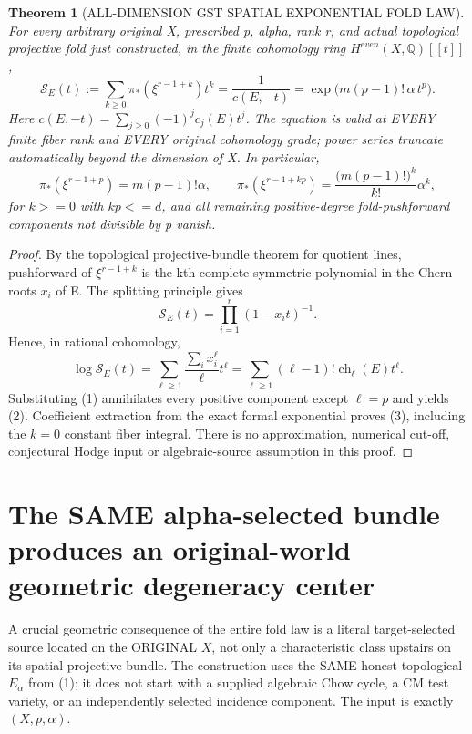 \documentclass[11pt]{article}
\newtheorem{theorem}{Theorem}
\begin{document}
\begin{theorem}[ALL-DIMENSION GST SPATIAL EXPONENTIAL FOLD LAW]
For every arbitrary original X, prescribed p, alpha, rank r,
and actual topological projective fold just constructed,
in the finite cohomology ring $H^{even}(X,\mathbb Q)[[t]]$,
\[
 \boxed{
 \mathcal S_E(t):=\sum_{k\ge0}
       \pi_*(\xi^{r-1+k})t^k
   =\frac{1}{c(E,-t)}
   =\exp\!\bigl(m(p-1)!\,\alpha\,t^p\bigr).
 }                                                        \tag{2}
\]
Here $c(E,-t)=\sum_{j\ge0}(-1)^j c_j(E)t^j$.
The equation is valid at EVERY finite fiber rank and
EVERY original cohomology grade; power series truncate
automatically beyond the dimension of X.
In particular,
\[
 \boxed{
   \pi_*(\xi^{r-1+p})=m(p-1)!\alpha, \qquad
   \pi_*(\xi^{r-1+kp})=
       \frac{\bigl(m(p-1)!\bigr)^k}{k!}\alpha^k,
 }                                                        \tag{3}
\]
for $k>=0$ with $kp<=d$, and all remaining positive-degree
fold-pushforward components not divisible by p vanish.
\end{theorem}
\begin{proof}
By the topological projective-bundle theorem for quotient
lines, pushforward of $\xi^{r-1+k}$ is the kth complete
symmetric polynomial in the Chern roots $x_i$ of E.
The splitting principle gives
\[
 \mathcal S_E(t)=\prod_{i=1}^r (1-x_i t)^{-1}.
\]
Hence, in rational cohomology,
\[
 \log\mathcal S_E(t)=\sum_{\ell\ge1}
     \frac{\sum_i x_i^\ell}{\ell}t^\ell
 =\sum_{\ell\ge1}(\ell-1)!
       \operatorname{ch}_\ell(E)t^\ell.                    \tag{4}
\]
Substituting (1) annihilates every positive component
except $\ell=p$ and yields (2).
Coefficient extraction from the exact formal exponential
proves (3), including the $k=0$ constant fiber integral.
There is no approximation, numerical cut-off, conjectural
Hodge input or algebraic-source assumption in this proof.
\end{proof}


\section{The SAME alpha-selected bundle produces an original-world geometric degeneracy center}
A crucial geometric consequence of the entire fold law is a
literal target-selected source located on the ORIGINAL
$X$, not only a characteristic class upstairs on its
spatial projective bundle. The construction uses the
SAME honest topological $E_\alpha$ from (1); it does
not start with a supplied algebraic Chow cycle, a CM
test variety, or an independently selected incidence component.
The input is exactly $(X,p,\alpha)$.
\end{document}

